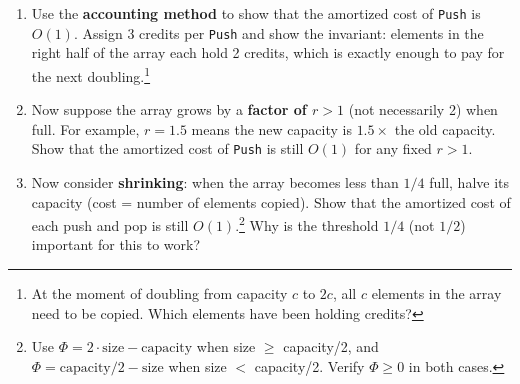 \documentclass[9pt]{book}
\begin{document}
\begin{enumerate}[label=\arabic*.]
\begin{enumerate}
    \item Use the \textbf{accounting method} to show that the amortized cost of \texttt{Push} is $O(1)$. Assign 3 credits per \texttt{Push} and show the invariant: elements in the right half of the array each hold 2 credits, which is exactly enough to pay for the next doubling.\footnote{At the moment of doubling from capacity $c$ to $2c$, all $c$ elements in the array need to be copied. Which elements have been holding credits?}
    \item Now suppose the array grows by a \textbf{factor of $r > 1$} (not necessarily 2) when full. For example, $r = 1.5$ means the new capacity is $1.5 \times$ the old capacity. Show that the amortized cost of \texttt{Push} is still $O(1)$ for any fixed $r > 1$.
    \item Now consider \textbf{shrinking}: when the array becomes less than $1/4$ full, halve its capacity (cost = number of elements copied). Show that the amortized cost of each push and pop is still $O(1)$.\footnote{Use $\Phi = 2 \cdot \text{size} - \text{capacity}$ when size $\geq$ capacity/2, and $\Phi = \text{capacity}/2 - \text{size}$ when size $<$ capacity/2. Verify $\Phi \geq 0$ in both cases.} Why is the threshold $1/4$ (not $1/2$) important for this to work?
\end{enumerate}





\end{enumerate}
\end{document}
